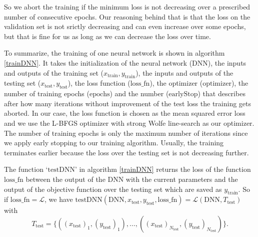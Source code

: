 So we abort the training if the minimum loss is not decreasing over a prescribed number of consecutive epochs. Our reasoning behind that is that the loss on the validation set is not srictly decreasing and can even increase over some epochs, but that is fine for us as long as we can decrease the loss over time.

To summarize, the training of one neural network is shown in algorithm \ref{trainDNN}. It takes the initialization of the neural network ($\mathrm{DNN}$), the inputs and outputs of the training set ($x_\mathrm{train}, y_\mathrm{train}$), the inputs and outputs of the testing set ($x_\mathrm{test}, y_\mathrm{test}$), the loss function ($\mathrm{loss\_fn}$), the optimizer ($\mathrm{optimizer}$), the number of training epochs ($\mathrm{epochs}$) and the number ($\mathrm{earlyStop}$) that describes after how many iterations without improvement of the test loss the training gets aborted. In our case, the loss function is chosen as the mean squared error loss and we use the L-BFGS optimizer with strong Wolfe line-search as our optimizer. The number of training epochs is only the maximum number of iterations since we apply early stopping to our training algorithm. Usually, the training terminates earlier because the loss over the testing set is not decreasing further.

The function `$\mathrm{testDNN}$' in algorithm \ref{trainDNN} returns the loss of the function $\mathrm{loss\_fn}$ between the output of the DNN with the current parameters and the output of the objective function over the testing set which are saved as $y_\mathrm{train}$. So if $\mathrm{loss\_fn}=\mathscr{L}$, we have $\mathrm{testDNN}(\mathrm{DNN}, x_\mathrm{test}, y_\mathrm{test}, \mathrm{loss\_fn}) = \mathscr{L}(\mathrm{DNN}, T_\mathrm{test})$ with
\begin{displaymath}
T_\mathrm{test}=\{((x_\mathrm{test})_1,(y_\mathrm{test})_1),\dotsc,((x_\mathrm{test})_{N_\mathrm{test}},(y_\mathrm{test})_{N_\mathrm{test}})\}.
\end{displaymath}

